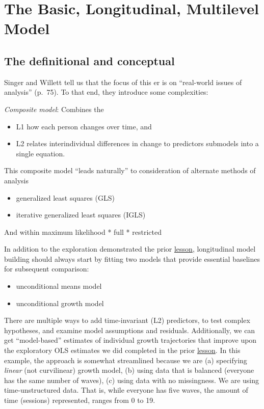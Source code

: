 \documentclass[
  english,
]{book}
\providecommand{\tightlist}{%
  \setlength{\itemsep}{0pt}\setlength{\parskip}{0pt}}
\begin{document}
\hypertarget{the-basic-longitudinal-multilevel-model}{%
\section{The Basic, Longitudinal, Multilevel Model}\label{the-basic-longitudinal-multilevel-model}}

\hypertarget{the-definitional-and-conceptual}{%
\subsection{The definitional and conceptual}\label{the-definitional-and-conceptual}}

Singer and Willett \citeyearpar{singer_applied_2003} tell us that the focus of this er is on ``real-world issues of analysis'' (p.~75). To that end, they introduce some complexities:

\emph{Composite model}: Combines the

\begin{itemize}
\tightlist
\item
  L1 how each person changes over time, and
\item
  L2 relates interindividual differences in change to predictors submodels into a single equation.
\end{itemize}

This composite model ``leads naturally'' to consideration of alternate methods of analysis

\begin{itemize}
\tightlist
\item
  generalized least squares (GLS)
\item
  iterative generalized least squares (IGLS)
\end{itemize}

And within maximum likelihood
* full
* restricted

In addition to the exploration demonstrated the prior \protect\hyperlink{MLMexplore}{lesson}, longitudinal model building should always start by fitting two models that provide essential baselines for subsequent comparison:

\begin{itemize}
\tightlist
\item
  unconditional means model
\item
  unconditional growth model
\end{itemize}

There are multiple ways to add time-invariant (L2) predictors, to test complex hypotheses, and examine model assumptions and residuals. Additionally, we can get ``model-based'' estimates of individual growth trajectories that improve upon the exploratory OLS estimates we did completed in the prior \protect\hyperlink{MLMexplore}{lesson}. In this example, the approach is somewhat streamlined because we are (a) specifying \emph{linear} (not curvilinear) growth model, (b) using data that is balanced (everyone has the same number of waves), (c) using data with no missingness. We are using time-unstructured data. That is, while everyone has five waves, the amount of time (sessions) represented, ranges from 0 to 19.
\end{document}
